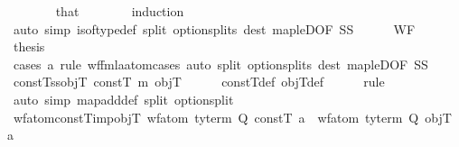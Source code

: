 \begin{isabellebody}
\ \ \ \ \ \ \isamarkupfalse%
\ that\isanewline
\ \ \ \ \ \ \isamarkupfalse%
\ induction\isanewline
\ \ \ \ \ \ \isamarkupfalse%
\ {\isacharparenleft}{\kern0pt}auto\ simp{\isacharcolon}{\kern0pt}\ is{\isacharunderscore}{\kern0pt}of{\isacharunderscore}{\kern0pt}type{\isacharunderscore}{\kern0pt}def\ split{\isacharcolon}{\kern0pt}\ option{\isachardot}{\kern0pt}splits\ dest{\isacharcolon}{\kern0pt}\ map{\isacharunderscore}{\kern0pt}leD{\isacharbrackleft}{\kern0pt}OF\ SS{\isacharbrackright}{\kern0pt}{\isacharparenright}{\kern0pt}\isanewline
\ \ \ \ \isamarkupfalse%
\ WF\ \isamarkupfalse%
\ {\isacharquery}{\kern0pt}thesis\isanewline
\ \ \ \ \ \ \isamarkupfalse%
\ {\isacharparenleft}{\kern0pt}cases\ a\ rule{\isacharcolon}{\kern0pt}\ wf{\isacharunderscore}{\kern0pt}fmla{\isacharunderscore}{\kern0pt}atom{\isachardot}{\kern0pt}cases{\isacharparenright}{\kern0pt}\ {\isacharparenleft}{\kern0pt}auto\ split{\isacharcolon}{\kern0pt}\ option{\isachardot}{\kern0pt}splits\ dest{\isacharcolon}{\kern0pt}\ map{\isacharunderscore}{\kern0pt}leD{\isacharbrackleft}{\kern0pt}OF\ SS{\isacharbrackright}{\kern0pt}{\isacharparenright}{\kern0pt}\isanewline
\ \ \isamarkupfalse%
%
\endisatagproof
{\isafoldproof}%
%
\isadelimproof
\isanewline
%
\endisadelimproof
\isanewline
\isanewline
\ \ \isamarkupfalse%
\ constT{\isacharunderscore}{\kern0pt}ss{\isacharunderscore}{\kern0pt}objT{\isacharcolon}{\kern0pt}\ {\isachardoublequoteopen}constT\ {\isasymsubseteq}\isactrlsub m\ objT{\isachardoublequoteclose}\isanewline
%
\isadelimproof
\ \ \ \ %
\endisadelimproof
%
\isatagproof
{}\isamarkupfalse%
\ constT{\isacharunderscore}{\kern0pt}def\ objT{\isacharunderscore}{\kern0pt}def\isanewline
\ \ \ \ \isamarkupfalse%
\ rule\isanewline
\ \ \ \ \isamarkupfalse%
\ {\isacharparenleft}{\kern0pt}auto\ simp{\isacharcolon}{\kern0pt}\ map{\isacharunderscore}{\kern0pt}add{\isacharunderscore}{\kern0pt}def\ split{\isacharcolon}{\kern0pt}\ option{\isachardot}{\kern0pt}split{\isacharparenright}{\kern0pt}%
\endisatagproof
{\isafoldproof}%
%
\isadelimproof
\isanewline
%
\endisadelimproof
\isanewline
\ \ \isamarkupfalse%
\ wf{\isacharunderscore}{\kern0pt}atom{\isacharunderscore}{\kern0pt}constT{\isacharunderscore}{\kern0pt}imp{\isacharunderscore}{\kern0pt}objT{\isacharcolon}{\kern0pt}\ {\isachardoublequoteopen}wf{\isacharunderscore}{\kern0pt}atom\ {\isacharparenleft}{\kern0pt}ty{\isacharunderscore}{\kern0pt}term\ Q\ constT{\isacharparenright}{\kern0pt}\ a\ {\isasymLongrightarrow}\ wf{\isacharunderscore}{\kern0pt}atom\ {\isacharparenleft}{\kern0pt}ty{\isacharunderscore}{\kern0pt}term\ Q\ objT{\isacharparenright}{\kern0pt}\ a{\isachardoublequoteclose}\isanewline

\end{isabellebody}
